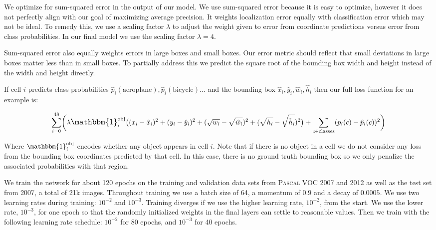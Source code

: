 \documentclass{article} %
\begin{document}
We optimize for sum-squared error in the output of our model. We use sum-squared error because it is easy to optimize, however it does not perfectly align with our goal of maximizing average precision. It weights localization error equally with classification error which may not be ideal. To remedy this, we use a scaling factor $\lambda$ to adjust the weight given to error from coordinate predictions versus error from class probabilities. In our final model we use the scaling factor $\lambda = 4$.

Sum-squared error also equally weights errors in large boxes and small boxes. Our error metric should reflect that small deviations in large boxes matter less than in small boxes. To partially address this we predict the square root of the bounding box width and height instead of the width and height directly. 

If cell $i$ predicts class probabilities $\hat{p}_i(\text{aeroplane}), \hat{p}_i(\text{bicycle})...$ and the bounding box $\hat{x}_i,\hat{y}_i, \hat{w}_i, \hat{h}_i$ then our full loss function for an example is:

\begin{equation}
\sum_{i = 0}^{48} \biggl( \lambda \mathlarger{\mathbbm{1}}_i^{\text{obj}}\bigl((x_i - \hat{x}_i)^2 + (y_i - \hat{y}_i)^2 + (\sqrt{w_i} - \sqrt{\hat{w}_i})^2 + (\sqrt{h_i} - \sqrt{\hat{h}_i})^2\bigr) + \sum_{c \in \text{classes}} (p_i(c) - \hat{p}_i(c))^2 \biggr)
\end{equation}

Where $\mathbbm{1}_i^{\text{obj}}$ encodes whether any object appears in cell $i$. Note that if there is no object in a cell we do not consider any loss from the bounding box coordinates predicted by that cell. In this case, there is no ground truth bounding box so we only penalize the associated probabilities with that region.

We train the network for about 120 epochs on the training and validation data sets from \textsc{Pascal} VOC 2007 and 2012 as well as the test set from 2007, a total of 21k images. Throughout training we use a batch size of 64, a momentum of $0.9$ and a decay of $0.0005$. We use two learning rates during training: $10^{-2}$ and $10^{-3}$. Training diverges if we use the higher learning rate, $10^{-2}$, from the start. We use the lower rate, $10^{-3}$, for one epoch so that the randomly initialized weights in the final layers can settle to reasonable values. Then we train with the following learning rate schedule: $10^{-2}$ for 80 epochs, and $10^{-3}$ for 40 epochs.
\end{document}
